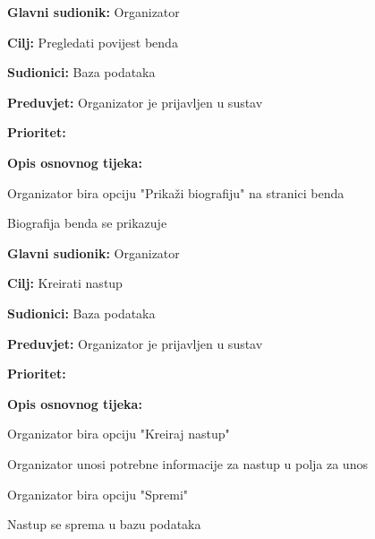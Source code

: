 \noindent {}
	\begin{packed_item}
		
		\item \textbf{Glavni sudionik: } Organizator
		\item \textbf{Cilj:} Pregledati povijest benda
		\item \textbf{Sudionici:} Baza podataka
		\item \textbf{Preduvjet:} Organizator je prijavljen u sustav
		\item \textbf{Prioritet:} 
		\item \textbf{Opis osnovnog tijeka:} 
		
		\item[] \begin{packed_enum}
			
			\item Organizator bira opciju "Prikaži biografiju" na stranici benda
			\item Biografija benda se prikazuje 
		\end{packed_enum}  
	\end{packed_item}

\noindent {}
	\begin{packed_item}
		
		\item \textbf{Glavni sudionik: } Organizator 
		\item \textbf{Cilj:} Kreirati nastup
		\item \textbf{Sudionici:} Baza podataka
		\item \textbf{Preduvjet:} Organizator je prijavljen u sustav
		\item \textbf{Prioritet:} 
		\item \textbf{Opis osnovnog tijeka:} 
		
		\item[] \begin{packed_enum}
			
			\item Organizator bira opciju "Kreiraj nastup"
			\item Organizator unosi potrebne informacije za nastup u polja za unos
			\item Organizator bira opciju "Spremi"
			\item Nastup se sprema u bazu podataka
		\end{packed_enum}  
	\end{packed_item}
		
